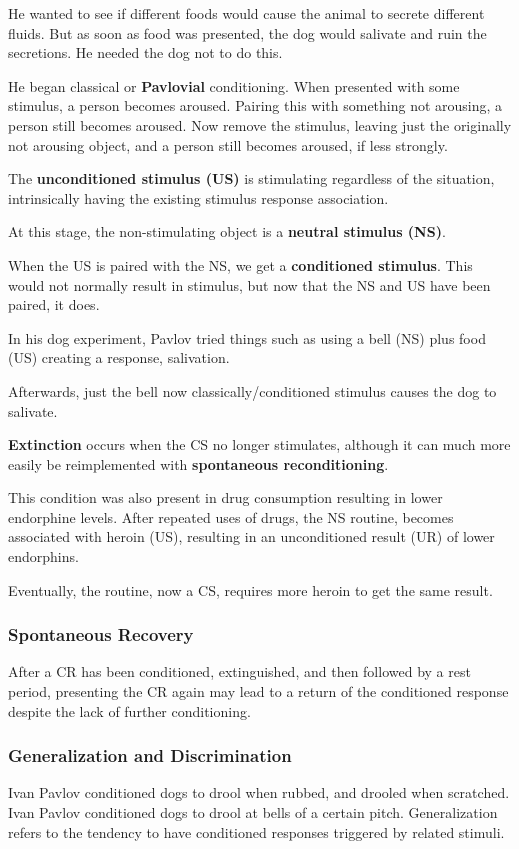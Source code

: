 \documentclass[12pt]{article}
\begin{document}
He wanted to see if different foods would cause the animal to secrete different fluids. But as soon as food was presented, the dog would salivate and ruin the secretions. He needed the dog not to do this.

He began classical or \textbf{Pavlovial} conditioning. When presented with some stimulus, a person becomes aroused. Pairing this with something not arousing, a person still becomes aroused. Now remove the stimulus, leaving just the originally not arousing object, and a person still becomes aroused, if less strongly.

The \textbf{unconditioned stimulus (US)} is stimulating regardless of the situation, intrinsically having the existing stimulus response association.

At this stage, the non-stimulating object is a \textbf{neutral stimulus (NS)}.

When the US is paired with the NS, we get a \textbf{conditioned stimulus}. This would not normally result in stimulus, but now that the NS and US have been paired, it does.

In his dog experiment, Pavlov tried things such as using a bell (NS) plus food (US) creating a response, salivation.

Afterwards, just the bell now classically/conditioned stimulus causes the dog to salivate.

\textbf{Extinction} occurs when the CS no longer stimulates, although it can much more easily be reimplemented with \textbf{spontaneous reconditioning}.

This condition was also present in drug consumption resulting in lower endorphine levels. After repeated uses of drugs, the NS routine, becomes associated with heroin (US), resulting in an unconditioned result (UR) of lower endorphins.

Eventually, the routine, now a CS, requires more heroin to get the same result.

\subsubsection*{Spontaneous Recovery}
After a CR has been conditioned, extinguished, and then followed by a rest period, presenting the CR again may lead to a return of the conditioned response despite the lack of further conditioning.

\subsubsection*{Generalization and Discrimination}
Ivan Pavlov conditioned dogs to drool when rubbed, and drooled when scratched. Ivan Pavlov conditioned dogs to drool at bells of a certain pitch. Generalization refers to the tendency to have conditioned responses triggered by related stimuli.
\end{document}
